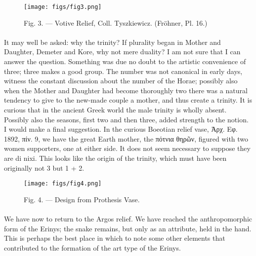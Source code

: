\documentclass[a4paper, 11pt, oneside, polutonikogreek, english]{article}
\begin{document}
\begin{figure}[H]
\centering
\texttt{[image: figs/fig3.png]}
\caption{\Fontauri Fig. 3. --- Votive Relief, Coll. Tyszkiewicz. (Fröhner, Pl. 16.)}
\end{figure}
\paragraph{}
It may well be asked: why the trinity? If plurality began in Mother and Daughter, Demeter and Kore, why not mere duality? I am not sure that I can answer the question. Something was due no doubt to the artistic convenience of three; three makes a good group. The number was not canonical in early days, witness the constant discussion about the number of the Horae; possibly also when the Mother and Daughter had become thoroughly two there was a natural tendency to give to the new-made couple a mother, and thus create a trinity. It is curious that in the ancient Greek world the male trinity is wholly absent. Possibly also the seasons, first two and then three, added strength to the notion. I would make a final suggestion. In the curious Boeotian relief vase, Ἀρχ. Εφ. 1892, πίν. 9, we have the great Earth mother, the πότνια θηρῶν, figured with two women supporters, one at either side. It does not seem necessary to suppose they are di nixi. This looks like the origin of the trinity, which must have been originally not 3 but 1 + 2.
\begin{figure}[H]
\centering
\texttt{[image: figs/fig4.png]}
\caption{\Fontauri Fig. 4. --- Design from Prothesis Vase.}
\end{figure}
\paragraph{}
We have now to return to the Argos relief. We have reached the anthropomorphic form of the Erinys; the snake remains, but only as an attribute, held in the hand. This is perhaps the best place in which to note some other elements that contributed to the formation of the art type of the Erinys.
\end{document}
